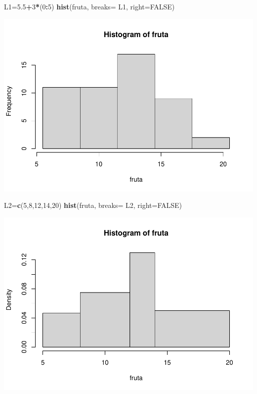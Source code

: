 \documentclass[
]{book}
\newenvironment{Shaded}{\begin{snugshade}}{\end{snugshade}}
\newcommand{\DataTypeTok}[1]{\textcolor[rgb]{0.13,0.29,0.53}{#1}}
\newcommand{\DecValTok}[1]{\textcolor[rgb]{0.00,0.00,0.81}{#1}}
\newcommand{\FloatTok}[1]{\textcolor[rgb]{0.00,0.00,0.81}{#1}}
\newcommand{\KeywordTok}[1]{\textcolor[rgb]{0.13,0.29,0.53}{\textbf{#1}}}
\newcommand{\NormalTok}[1]{#1}
\newcommand{\OperatorTok}[1]{\textcolor[rgb]{0.81,0.36,0.00}{\textbf{#1}}}
\newcommand{\OtherTok}[1]{\textcolor[rgb]{0.56,0.35,0.01}{#1}}
\theoremstyle{definition}
\theoremstyle{definition}
\theoremstyle{definition}
\theoremstyle{remark}
\begin{document}
\begin{Shaded}
\begin{Highlighting}[]
\NormalTok{L1=}\FloatTok{5.5}\OperatorTok{+}\DecValTok{3}\OperatorTok{*}\NormalTok{(}\DecValTok{0}\OperatorTok{:}\DecValTok{5}\NormalTok{)}
\KeywordTok{hist}\NormalTok{(fruta, }\DataTypeTok{breaks=}\NormalTok{ L1, }\DataTypeTok{right=}\OtherTok{FALSE}\NormalTok{)}
\end{Highlighting}
\end{Shaded}

\begin{center}\includegraphics[width=0.9\linewidth]{13chap13_Agrupados_files/figure-latex/unnamed-chunk-68-1} \end{center}

\begin{Shaded}
\begin{Highlighting}[]
\NormalTok{L2=}\KeywordTok{c}\NormalTok{(}\DecValTok{5}\NormalTok{,}\DecValTok{8}\NormalTok{,}\DecValTok{12}\NormalTok{,}\DecValTok{14}\NormalTok{,}\DecValTok{20}\NormalTok{)}
\KeywordTok{hist}\NormalTok{(fruta, }\DataTypeTok{breaks=}\NormalTok{ L2, }\DataTypeTok{right=}\OtherTok{FALSE}\NormalTok{)}
\end{Highlighting}
\end{Shaded}

\begin{center}\includegraphics[width=0.9\linewidth]{13chap13_Agrupados_files/figure-latex/unnamed-chunk-69-1} \end{center}
\end{document}
